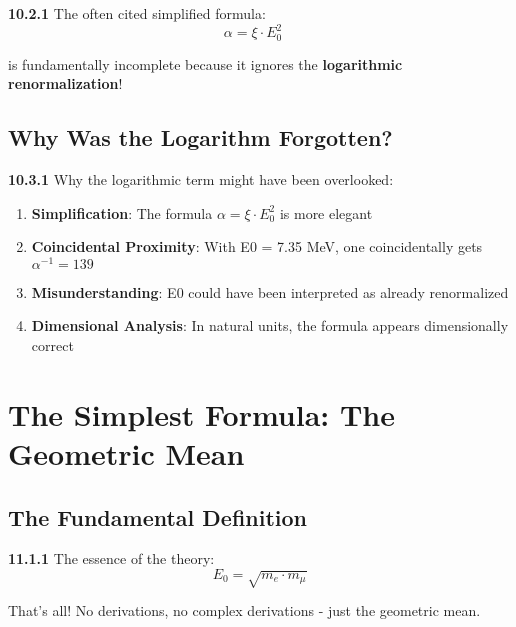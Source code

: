 \documentclass[12pt,a4paper]{article}
\begin{document}
\noindent \textbf{10.2.1} The often cited simplified formula:
\begin{equation}
	\boxed{\alpha = \xi \cdot E_0^2} \quad 
\end{equation}

is fundamentally incomplete because it ignores the \textbf{logarithmic renormalization}!

\subsection{Why Was the Logarithm Forgotten?}

\begin{tcolorbox}[colback=yellow!5!white,colframe=orange!75!black,title=Possible Reasons]
	\noindent \textbf{10.3.1} Why the logarithmic term might have been overlooked:
	\begin{enumerate}
		\item \textbf{Simplification}: The formula $\alpha = \xi \cdot E_0^2$ is more elegant
		\item \textbf{Coincidental Proximity}: With E0 = 7.35 MeV, one coincidentally gets $\alpha^{-1} = 139$
		\item \textbf{Misunderstanding}: E0 could have been interpreted as already renormalized
		\item \textbf{Dimensional Analysis}: In natural units, the formula appears dimensionally correct
	\end{enumerate}
\end{tcolorbox}

\section{The Simplest Formula: The Geometric Mean}

\subsection{The Fundamental Definition}

\begin{tcolorbox}[colback=yellow!10!white,colframe=red!75!black,title=\textbf{THE SIMPLEST FORMULA}]
	\noindent \textbf{11.1.1} The essence of the theory:
	\begin{equation}
		\boxed{E_0 = \sqrt{m_e \cdot m_\mu}}
	\end{equation}
	
	That's all! No derivations, no complex derivations - just the geometric mean.
\end{tcolorbox}
\end{document}
